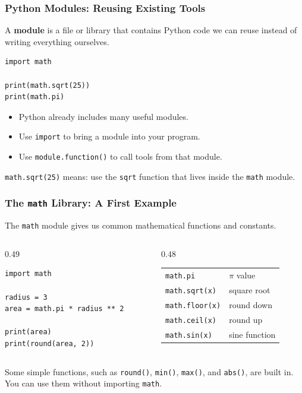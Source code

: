 \documentclass[aspectratio=169,10pt]{beamer}
\newcommand{\keyword}[1]{\textcolor{PrimaryBlue}{\textbf{#1}}}
\newcommand{\myitem}[1]{\item #1\vspace{0.04cm}}
\begin{document}
\begin{frame}[fragile]
\frametitle{Python Modules: Reusing Existing Tools}
\begin{tcolorbox}[lecturebox,title=Key idea]
A \keyword{module} is a file or library that contains Python code we can reuse instead of writing everything ourselves.
\end{tcolorbox}

\begin{lstlisting}[style=pycode]
import math

print(math.sqrt(25))
print(math.pi)
\end{lstlisting}

\begin{itemize}\setlength\itemsep{0.01cm}
  \myitem{Python already includes many useful modules.}
  \myitem{Use \texttt{import} to bring a module into your program.}
  \myitem{Use \texttt{module.function()} to call tools from that module.}
\end{itemize}

\begin{tcolorbox}[lecturebox,title=Beginner interpretation]
\texttt{math.sqrt(25)} means: use the \texttt{sqrt} function that lives inside the \texttt{math} module.
\end{tcolorbox}
\end{frame}


\begin{frame}[fragile]
\frametitle{The \texttt{math} Library: A First Example}
The \texttt{math} module gives us common mathematical functions and constants.

\begin{columns}[T,totalwidth=\textwidth]
\begin{column}{0.49\textwidth}
\begin{lstlisting}[style=pycode]
import math

radius = 3
area = math.pi * radius ** 2

print(area)
print(round(area, 2))
\end{lstlisting}
\end{column}
\begin{column}{0.48\textwidth}
\begin{tcolorbox}[lecturebox,title=Examples you may see]
\small
\begin{tabular}{@{}ll@{}}
\texttt{math.pi} & $\pi$ value \\
\texttt{math.sqrt(x)} & square root \\
\texttt{math.floor(x)} & round down \\
\texttt{math.ceil(x)} & round up \\
\texttt{math.sin(x)} & sine function
\end{tabular}
\end{tcolorbox}
\end{column}
\end{columns}

\begin{tcolorbox}[lecturebox,title=Important note]
Some simple functions, such as \texttt{round()}, \texttt{min()}, \texttt{max()}, and \texttt{abs()}, are built in. You can use them without importing \texttt{math}.
\end{tcolorbox}
\end{frame}
\end{document}
